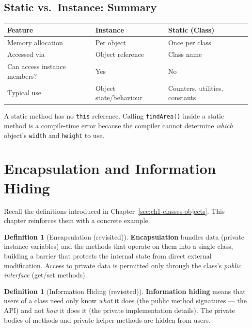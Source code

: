 \documentclass[11pt, a4paper, notitlepage]{report}
\theoremstyle{definition}
\newtheorem{definition}[theorem]{Definition}
\theoremstyle{remark}
\theoremstyle{definition}
\begin{document}
\subsection{Static vs.\ Instance: Summary}
\label{sec:ch2-static-vs-instance}

\begin{center}
\begin{tabular}{lll}
\toprule
\textbf{Feature} & \textbf{Instance} & \textbf{Static (Class)} \\
\midrule
Memory allocation & Per object & Once per class \\
Accessed via & Object reference & Class name \\
Can access instance members? & Yes & No \\
Typical use & Object state/behaviour & Counters, utilities, constants \\
\bottomrule
\end{tabular}
\end{center}

\begin{warning}[title={Warning: Static Methods Cannot Call Instance Methods Directly}]
A static method has no \texttt{this} reference. Calling \texttt{findArea()} inside a static method is a compile-time error because the compiler cannot determine \emph{which} object's \texttt{width} and \texttt{height} to use.
\end{warning}

\section{Encapsulation and Information Hiding}
\label{sec:ch2-encapsulation}

Recall the definitions introduced in Chapter~\ref{sec:ch1-classes-objects}. This chapter reinforces them with a concrete example.

\begin{definition}[Encapsulation (revisited)]
\label{def:ch2-encapsulation}
\textbf{Encapsulation} bundles data (private instance variables) and the methods that operate on them into a single class, building a barrier that protects the internal state from direct external modification. Access to private data is permitted only through the class's \emph{public interface} (get/set methods).
\end{definition}

\begin{definition}[Information Hiding (revisited)]
\label{def:ch2-info-hiding}
\textbf{Information hiding} means that users of a class need only know \emph{what} it does (the public method signatures --- the API) and not \emph{how} it does it (the private implementation details). The private bodies of methods and private helper methods are hidden from users.
\end{definition}
\end{document}
